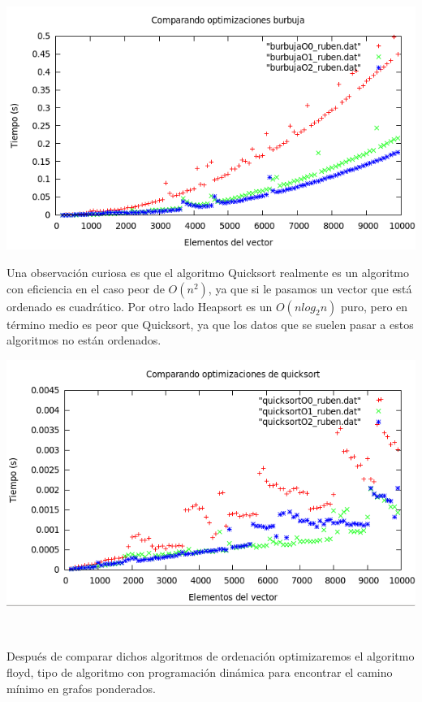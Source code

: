 \documentclass[11pt,spanish]{article} %
\begin{document}
\begin{center}
\includegraphics[scale=0.55]{../Graficas/Burbuja/burbuja_optimizacion.png}
\end{center}

Una observación curiosa es que el algoritmo Quicksort realmente es un algoritmo con eficiencia en el caso peor de $O(n^2)$, ya que si le pasamos un vector que está ordenado es cuadrático. Por otro lado Heapsort es un $O(nlog_2n)$ puro, pero en término medio es peor que Quicksort, ya que los datos que se suelen pasar a estos algoritmos no están ordenados.

\begin{center}
\includegraphics[scale=0.55]{../Graficas/Quicksort/quicksort_optimizacion.png}
\end{center}

{\ }

Después de comparar dichos algoritmos de ordenación optimizaremos el algoritmo floyd, tipo de algoritmo con programación dinámica para encontrar el camino mínimo en grafos ponderados.
\end{document}
